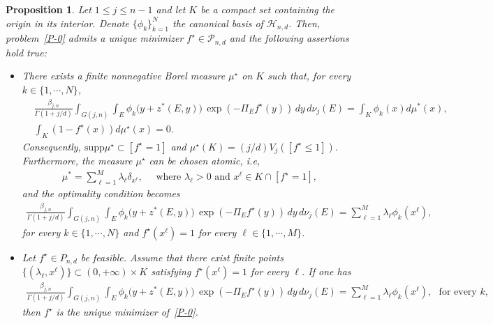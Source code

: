 \documentclass[11pt]{article}
\newtheorem{proposition}[theorem]{Proposition}
\theoremstyle{definition}
\numberwithin{equation}{section}
\newcommand{\R}{\mathbb{R}}
\newcommand{\cH}{\mathcal{H}}        %
\newcommand{\cP}{\mathcal{P}}        %
\begin{document}

\begin{proposition}\label{prop.KKT-JOHN}
Let $1 \leq j \leq n - 1$ and let $K$ be a compact set containing the origin in its interior.
Denote $\{ \phi_k \}_{k = 1}^N$ the canonical basis of $\cH_{n, d}$.
Then, problem~\eqref{P-0} admits a unique minimizer $f^\star \in \cP_{n, d}$ and the following assertions hold true:
\begin{itemize}
	\item[(i)] There exists a finite nonnegative Borel measure $\mu^\star$ on $K$ such that, for every $k \in \{1, \cdots, N \}$,
	\begin{align*}
		& \frac{\beta_{j,n}}{\Gamma(1+j/d)}\int_{G(j,n)}\!\int_E \phi_k \big(y+z^\ast(E,y)\big)\, \exp(-\Pi_E f^\star(y))\,dy\,d\nu_j(E) = \int_K \phi_k(x) d\mu^*(x),  \\
		& \int_K (1 - f^\star(x))d\mu^\star(x) = 0.
	\end{align*}
	Consequently, $\mathrm{supp} \mu^\star \subset [f^\star = 1]$ and $\mu^\star(K) = (j/d) V_j([f^\star \leq 1])$.
	Furthermore, the measure $\mu^\star$ can be chosen atomic, i.e,
	\begin{align*}
		\mu^* = \sum_{\ell = 1}^M \lambda_\ell \delta_{x^\ell}, \quad 
		\text{ where } \lambda_\ell > 0 \text{ and } x^\ell \in K \cap [f^\star = 1],
	\end{align*}
	and the optimality condition becomes
	\begin{align*}
		\frac{\beta_{j,n}}{\Gamma(1+j/d)}\int_{G(j,n)}\!\int_E \phi_k \big(y+z^\ast(E,y)\big)\, \exp(-\Pi_E f^\star(y))\,dy\,d\nu_j(E) = \sum_{\ell = 1}^M \lambda_\ell \phi_k(x^\ell), 
	\end{align*}
for every $k \in \{1, \cdots, N \}$ and $f^\star(x^\ell) = 1$ for every $\ell \in \{1, \cdots, M \}$.
	\item[(ii)]
	Let $f^\star\in P_{n,d}$ be feasible.
	Assume that there exist finite points $\{ (\lambda_\ell, x^\ell) \} \subset (0, + \infty) \times K$ satisfying $f^\star(x^\ell) = 1$ for every $\ell$.
If one has
	\begin{align*}
	\frac{\beta_{j,n}}{\Gamma(1+j/d)}\int_{G(j,n)}\!\int_E \phi_k \big(y+z^\ast(E,y)\big)\, \exp(-\Pi_E f^\star(y))\,dy\,d\nu_j(E) = \sum_{\ell = 1}^M \lambda_\ell \phi_k(x^\ell), \,\, \text{ for every } k,
	\end{align*}
then $f^\star$ is the unique minimizer of~\eqref{P-0}.
\end{itemize}
\end{proposition}
\end{document}
